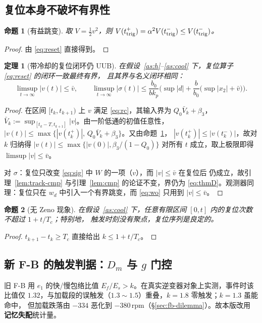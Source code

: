 \documentclass[11pt,a4paper]{article}
\newtheorem{theorem}{定理}
\newtheorem{proposition}{命题}
\theoremstyle{remark}
\begin{document}
\subsection{复位本身不破坏有界性}
\begin{proposition}[有益跳变]\label{prop:jump}
取 $V=\tfrac12v^2$，则 $V(t_{\rm trig}^+)=\alpha^2V(t_{\rm trig}^-)\le V(t_{\rm trig}^-)$。
\end{proposition}
\begin{proof}
由 \eqref{eq:reset} 直接得到。
\end{proof}

\begin{theorem}[带冷却的复位闭环仍 UUB]\label{thm:lawf}
在假设~\ref{as:h}--\ref{as:cool} 下，复位算子 \eqref{eq:reset} 的闭环一致最终有界，
且其界与名义闭环相同：
\begin{equation}
\limsup_{t\to\infty}|v(t)|\le\bar v,\qquad
\limsup_{t\to\infty}|\sigma(t)|\le \frac{b_0}{b k_p}\Big(\sup|d|+\frac{b}{b_0}\big(\sup|x_2|+\bar v\big)\Big).
\label{eq:thmF}
\end{equation}
\end{theorem}
\begin{proof}
在区间 $[t_k,t_{k+1})$ 上 $v$ 满足 \eqref{eq:rc}，其输入界为 $Q_0\bar V_k+\beta_3$，
$\bar V_k:=\sup_{[t_k-T,t_{k+1}]}|v|$。由一阶低通的初值任意性，
$|v(t)|\le \max\{|v(t_k^+)|,\,Q_0\bar V_k+\beta_3\}$。又由命题~\ref{prop:jump}，
$|v(t_k^+)|\le|v(t_k^-)|$，故对 $k$ 归纳得
$|v(t)|\le\max\{|v(0)|,\beta_3/(1-Q_0)\}$ 对所有 $t$ 成立，取上极限即得
$\limsup|v|\le\bar v$。

对 $\sigma$：复位只改变 \eqref{eq:sig} 中 $W$ 的一项（$v$），而 $|v|\le\bar v$ 在复位后
仍成立，故引理~\ref{lem:track-cmp} 与引理~\ref{lem:cmp} 的论证不变，界仍为
\eqref{eq:thmD}。观测器同理：复位只在 $w_d$ 中引入一个有界跳变，而 \eqref{eq:wo} 只用到
$|v|\le\bar v$。
\end{proof}

\begin{proposition}[无 Zeno 现象]\label{prop:zeno}
在假设~\ref{as:cool} 下，任意有限区间 $[0,t]$ 内的复位次数不超过 $1+t/T_c$；特别地，
触发时刻没有聚点，复位序列是良定的。
\end{proposition}
\begin{proof}
$t_{k+1}-t_k\ge T_c$ 直接给出 $k\le 1+t/T_c$。
\end{proof}

\subsection{新 F-B 的触发判据：$D_m$ 与 $g$ 门控}\label{sec:fb-trigger}
旧 F-B 用 $e_1$ 的快/慢包络比值 $E_f/E_s>k$。在真实逆变器对象上实测，事件时该比值仅
$1.32$，与加载段的误触发（$1.3\sim1.5$）重叠，$k=1.8$ 零触发；$k=1.3$ 虽能命中，
但加载跌落由 $-334$ 恶化到 $-380$\,rpm（\S\ref{sec:fb-dilemma}）。故本版改用
\textbf{记忆失配}统计量。
\end{document}

